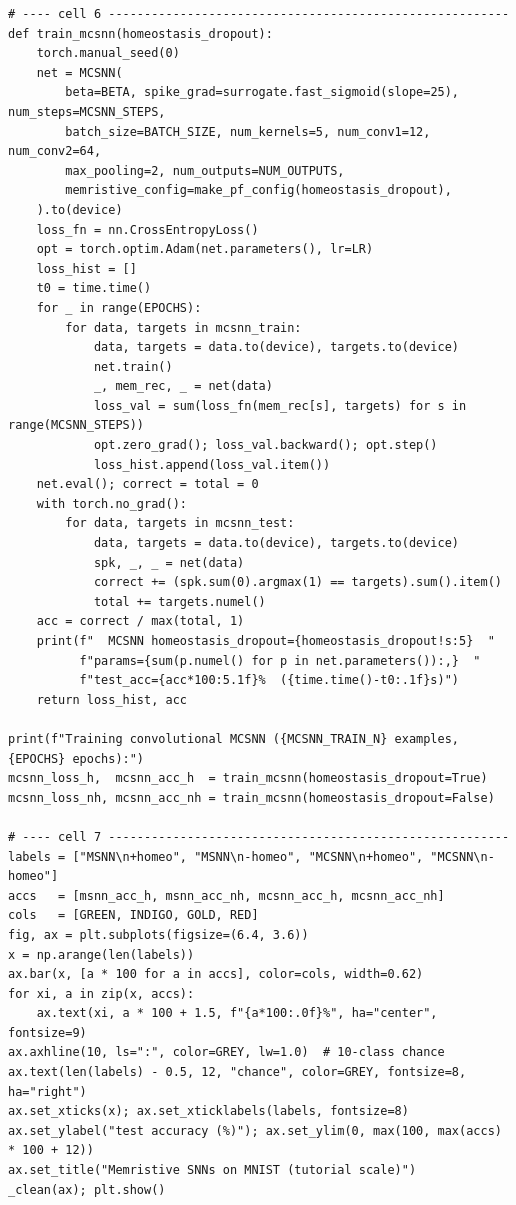 \begin{lstlisting}[caption={experiments/examples.ipynb},label={lst:mnn-nb-examples}]
# ---- cell 6 --------------------------------------------------------
def train_mcsnn(homeostasis_dropout):
    torch.manual_seed(0)
    net = MCSNN(
        beta=BETA, spike_grad=surrogate.fast_sigmoid(slope=25), num_steps=MCSNN_STEPS,
        batch_size=BATCH_SIZE, num_kernels=5, num_conv1=12, num_conv2=64,
        max_pooling=2, num_outputs=NUM_OUTPUTS,
        memristive_config=make_pf_config(homeostasis_dropout),
    ).to(device)
    loss_fn = nn.CrossEntropyLoss()
    opt = torch.optim.Adam(net.parameters(), lr=LR)
    loss_hist = []
    t0 = time.time()
    for _ in range(EPOCHS):
        for data, targets in mcsnn_train:
            data, targets = data.to(device), targets.to(device)
            net.train()
            _, mem_rec, _ = net(data)
            loss_val = sum(loss_fn(mem_rec[s], targets) for s in range(MCSNN_STEPS))
            opt.zero_grad(); loss_val.backward(); opt.step()
            loss_hist.append(loss_val.item())
    net.eval(); correct = total = 0
    with torch.no_grad():
        for data, targets in mcsnn_test:
            data, targets = data.to(device), targets.to(device)
            spk, _, _ = net(data)
            correct += (spk.sum(0).argmax(1) == targets).sum().item()
            total += targets.numel()
    acc = correct / max(total, 1)
    print(f"  MCSNN homeostasis_dropout={homeostasis_dropout!s:5}  "
          f"params={sum(p.numel() for p in net.parameters()):,}  "
          f"test_acc={acc*100:5.1f}%  ({time.time()-t0:.1f}s)")
    return loss_hist, acc

print(f"Training convolutional MCSNN ({MCSNN_TRAIN_N} examples, {EPOCHS} epochs):")
mcsnn_loss_h,  mcsnn_acc_h  = train_mcsnn(homeostasis_dropout=True)
mcsnn_loss_nh, mcsnn_acc_nh = train_mcsnn(homeostasis_dropout=False)

# ---- cell 7 --------------------------------------------------------
labels = ["MSNN\n+homeo", "MSNN\n-homeo", "MCSNN\n+homeo", "MCSNN\n-homeo"]
accs   = [msnn_acc_h, msnn_acc_nh, mcsnn_acc_h, mcsnn_acc_nh]
cols   = [GREEN, INDIGO, GOLD, RED]
fig, ax = plt.subplots(figsize=(6.4, 3.6))
x = np.arange(len(labels))
ax.bar(x, [a * 100 for a in accs], color=cols, width=0.62)
for xi, a in zip(x, accs):
    ax.text(xi, a * 100 + 1.5, f"{a*100:.0f}%", ha="center", fontsize=9)
ax.axhline(10, ls=":", color=GREY, lw=1.0)  # 10-class chance
ax.text(len(labels) - 0.5, 12, "chance", color=GREY, fontsize=8, ha="right")
ax.set_xticks(x); ax.set_xticklabels(labels, fontsize=8)
ax.set_ylabel("test accuracy (%)"); ax.set_ylim(0, max(100, max(accs) * 100 + 12))
ax.set_title("Memristive SNNs on MNIST (tutorial scale)")
_clean(ax); plt.show()


\end{lstlisting}
